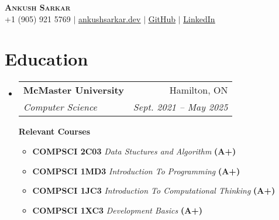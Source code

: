 \documentclass[letterpaper,10pt]{article}
\makeatletter
\newcommand{\resumeSubheading}[4]{
  \vspace{-1pt}\item
    \begin{tabular*}{0.97\textwidth}[t]{l@{\extracolsep{\fill}}r}
      \textbf{#1} & #2 \\
      \textit{\normalsize#3} & \textit{\normalsize #4} \\
    \end{tabular*}\vspace{-7pt}
}
\newcommand{\resumeSubHeadingListStart}{\begin{itemize}[leftmargin=0.15in, label={}]}
\newcommand{\resumeSubHeadingListEnd}{\end{itemize}}
\makeatother
\begin{document}

\begin{center}
  \textbf{\Huge \scshape Ankush Sarkar} \\ \vspace{1pt}
  \small +1 (905) 921 5769 $|$ \href{https://www.ankushsarkar.dev/}{\underline{ankushsarkar.dev}} $|$
  \href{https://github.com/AnkushSarkar10}{\underline{GitHub}} $|$
  \href{https://www.linkedin.com/in/ankush-sarkar-a55a5b213/}{\underline{LinkedIn}}
\end{center}


\section{Education}
\resumeSubHeadingListStart
\resumeSubheading
{McMaster University}{Hamilton, ON}
{Computer Science}{Sept. 2021 -- May 2025}

\vspace{7pt}
\textbf{Relevant Courses}
\vspace{-5pt}
\begin{itemize}[leftmargin=0.15in, label={}]
  \item  \vspace{-1pt}  \textbf{COMPSCI 2C03} \textit{Data Stuctures and Algorithm}  \textbf{(A+)}
  \item  \vspace{-1pt}  \textbf{COMPSCI 1MD3} \textit{Introduction To Programming}  \textbf{(A+)}
  \item  \vspace{-1pt}  \textbf{COMPSCI 1JC3} \textit{Introduction To Computational Thinking}  \textbf{(A+)}
  \item  \vspace{-1pt}  \textbf{COMPSCI 1XC3} \textit{Development Basics}  \textbf{(A+)}
\end{itemize}
\vspace{-10pt}
\resumeSubHeadingListEnd


%
\end{document}
